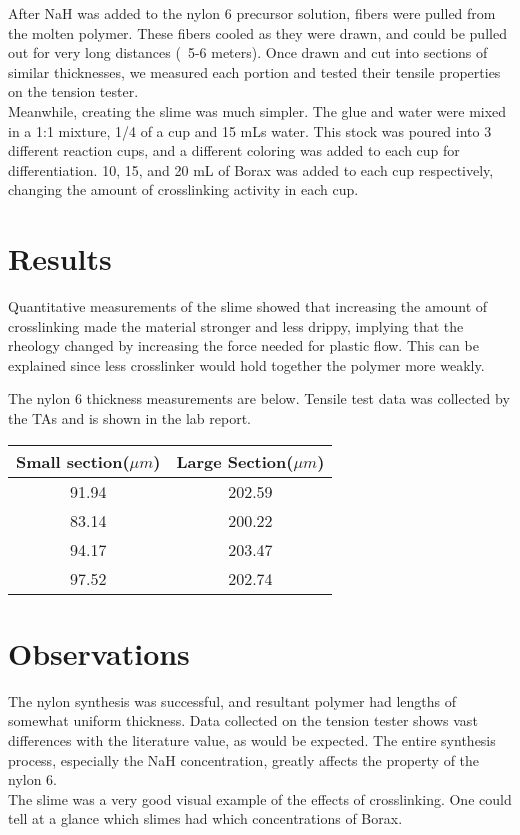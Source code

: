 \documentclass{article}
\begin{document}
After NaH was added to the nylon 6 precursor solution, fibers were pulled from the molten polymer. These fibers cooled as they were drawn, and could be pulled out for very long distances (~5-6 meters). Once drawn and cut into sections of similar thicknesses, we measured each portion and tested their tensile properties on the tension tester.\\

Meanwhile, creating the slime was much simpler. The glue and water were mixed in a 1:1 mixture, 1/4 of a cup and 15 mLs water. This stock was poured into 3 different reaction cups, and a different coloring was added to each cup for differentiation. 10, 15, and 20 mL of Borax was added to each cup respectively, changing the amount of crosslinking activity in each cup.
\section{Results}

Quantitative measurements of the slime showed that increasing the amount of crosslinking made the material stronger and less drippy, implying that the rheology changed by increasing the force needed for plastic flow. This can be explained since less crosslinker would hold together the polymer more weakly.

The nylon 6 thickness measurements are below. Tensile test data was collected by the TAs and is shown in the lab report.
\begin{table}[h]
\centering
\begin{tabular}{|| c | c ||}
\hline
Small section($\mu m$) & Large Section($\mu m$)\\
\hline
\hline
91.94 & 202.59\\
\hline
83.14 & 200.22\\
\hline
94.17 & 203.47\\
\hline
97.52 & 202.74\\
\hline
\end{tabular}
\end{table}

\section{Observations}

The nylon synthesis was successful, and resultant polymer had lengths of somewhat uniform thickness. Data collected on the tension tester shows vast differences with the literature value, as would be expected. The entire synthesis process, especially the NaH concentration, greatly affects the property of the nylon 6.\\

The slime was a very good visual example of the effects of crosslinking. One could tell at a glance which slimes had which concentrations of Borax.
\end{document}
